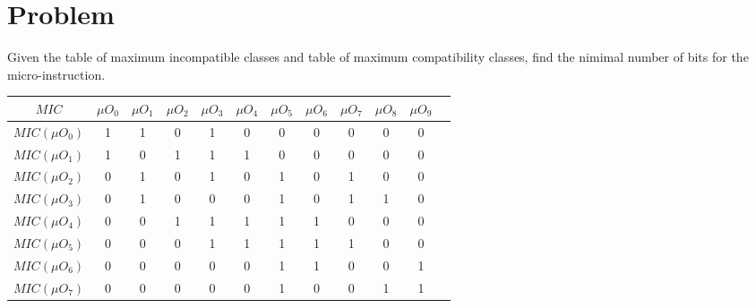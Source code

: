 \section*{Problem}

Given the table of maximum incompatible classes and table of maximum compatibility classes, find the nimimal number of bits for the micro-instruction.

\begin{table}[H]
    \centering
        \begin{tabular}{|c|c|c|c|c|c|c|c|c|c|c|c|}
            \hline
            $MIC$ & $\mu O_{0}$ & $\mu O_{1}$ & $\mu O_{2}$ & $\mu O_{3}$ & $\mu O_{4}$ & $\mu O_{5}$ & $\mu O_{6}$ & $\mu O_{7}$ & $\mu O_{8}$ & $\mu O_{9}$ \\ \hline
            $MIC(\mu O_{0})$ & 1 & 1 & 0 & 1 & 0 & 0 & 0 & 0 & 0 & 0 \\ \hline
            $MIC(\mu O_{1})$ & 1 & 0 & 1 & 1 & 1 & 0 & 0 & 0 & 0 & 0 \\ \hline
            $MIC(\mu O_{2})$ & 0 & 1 & 0 & 1 & 0 & 1 & 0 & 1 & 0 & 0 \\ \hline
            $MIC(\mu O_{3})$ & 0 & 1 & 0 & 0 & 0 & 1 & 0 & 1 & 1 & 0 \\ \hline
            $MIC(\mu O_{4})$ & 0 & 0 & 1 & 1 & 1 & 1 & 1 & 0 & 0 & 0 \\ \hline
            $MIC(\mu O_{5})$ & 0 & 0 & 0 & 1 & 1 & 1 & 1 & 1 & 0 & 0 \\ \hline
            $MIC(\mu O_{6})$ & 0 & 0 & 0 & 0 & 0 & 1 & 1 & 0 & 0 & 1 \\ \hline
            $MIC(\mu O_{7})$ & 0 & 0 & 0 & 0 & 0 & 1 & 0 & 0 & 1 & 1 \\ \hline
        \end{tabular}
\end{table}

